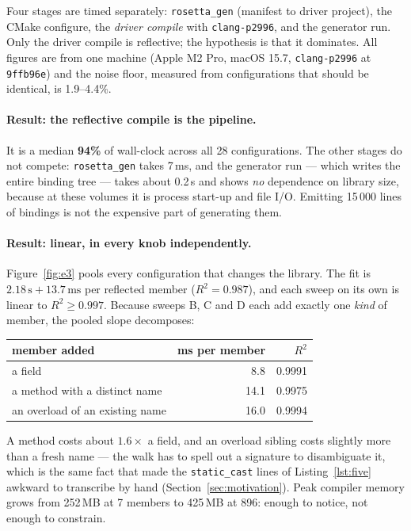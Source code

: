 \documentclass[11pt,a4paper]{article}
\newcommand{\code}[1]{\texttt{\small #1}}
\begin{document}
Four stages are timed separately: \code{rosetta\_gen} (manifest to driver
project), the CMake configure, the \emph{driver compile} with
\code{clang-p2996}, and the generator run. Only the driver compile is
reflective; the hypothesis is that it dominates. All figures are from one
machine (Apple M2 Pro, macOS 15.7, \code{clang-p2996} at \code{9ffb96e}) and the
noise floor, measured from configurations that should be identical, is
1.9--4.4\%.

\paragraph{Result: the reflective compile is the pipeline.} It is a median
\textbf{94\%} of wall-clock across all 28 configurations. The other stages do
not compete: \code{rosetta\_gen} takes 7\,ms, and the generator run --- which
writes the entire binding tree --- takes about 0.2\,s and shows \emph{no}
dependence on library size, because at these volumes it is process start-up and
file I/O. Emitting 15\,000 lines of bindings is not the expensive part of
generating them.

\paragraph{Result: linear, in every knob independently.} Figure~\ref{fig:e3}
pools every configuration that changes the library. The fit is $2.18\,\text{s} +
13.7\,\text{ms}$ per reflected member ($R^2 = 0.987$), and each sweep on its own
is linear to $R^2 \ge 0.997$. Because sweeps B, C and D each add exactly one
\emph{kind} of member, the pooled slope decomposes:

\begin{center}\small
\begin{tabular}{lrr}
\toprule
member added & ms per member & $R^2$ \\
\midrule
a field                        & 8.8  & 0.9991 \\
a method with a distinct name  & 14.1 & 0.9975 \\
an overload of an existing name & 16.0 & 0.9994 \\
\bottomrule
\end{tabular}
\end{center}

A method costs about $1.6\times$ a field, and an overload sibling costs slightly
more than a fresh name --- the walk has to spell out a signature to disambiguate
it, which is the same fact that made the \code{static\_cast} lines of
Listing~\ref{lst:five} awkward to transcribe by hand
(Section~\ref{sec:motivation}). Peak compiler memory grows
from 252\,MB at 7 members to 425\,MB at 896: enough to notice, not enough to
constrain.
\end{document}

